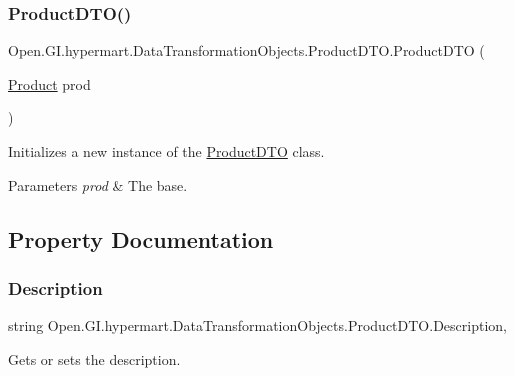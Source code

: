 \subsubsection{\texorpdfstring{Product\+D\+T\+O()}{ProductDTO()}\hspace{0.1cm}{\footnotesize\ttfamily [2/2]}}
{\footnotesize\ttfamily Open.\+G\+I.\+hypermart.\+Data\+Transformation\+Objects.\+Product\+D\+T\+O.\+Product\+D\+TO (\begin{DoxyParamCaption}\item[{\hyperlink{class_open_1_1_g_i_1_1hypermart_1_1_models_1_1_product}{Product}}]{prod }\end{DoxyParamCaption})}



Initializes a new instance of the \hyperlink{class_open_1_1_g_i_1_1hypermart_1_1_data_transformation_objects_1_1_product_d_t_o}{Product\+D\+TO} class. 


\begin{DoxyParams}{Parameters}
{\em prod} & The base.\\
\hline
\end{DoxyParams}


\subsection{Property Documentation}
\hypertarget{class_open_1_1_g_i_1_1hypermart_1_1_data_transformation_objects_1_1_product_d_t_o_a1de153f9a50688af8c97932d30056fef}{}\label{class_open_1_1_g_i_1_1hypermart_1_1_data_transformation_objects_1_1_product_d_t_o_a1de153f9a50688af8c97932d30056fef} 
\subsubsection{\texorpdfstring{Description}{Description}}
{\footnotesize\ttfamily string Open.\+G\+I.\+hypermart.\+Data\+Transformation\+Objects.\+Product\+D\+T\+O.\+Description\hspace{0.3cm}{\ttfamily [get]}, {\ttfamily [set]}}



Gets or sets the description. 

